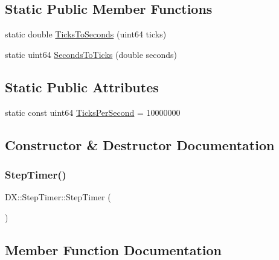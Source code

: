 \subsection*{Static Public Member Functions}
\begin{DoxyCompactItemize}
\item 
static double \hyperlink{class_d_x_1_1_step_timer_a59a20b9b3294d930299991c62703b0d0}{Ticks\+To\+Seconds} (uint64 ticks)
\item 
static uint64 \hyperlink{class_d_x_1_1_step_timer_af6a26dd87202d9eeb167cc0b6e3c1a56}{Seconds\+To\+Ticks} (double seconds)
\end{DoxyCompactItemize}
\subsection*{Static Public Attributes}
\begin{DoxyCompactItemize}
\item 
static const uint64 \hyperlink{class_d_x_1_1_step_timer_aa671440c6c8008bd407ae889f5fb9f87}{Ticks\+Per\+Second} = 10000000
\end{DoxyCompactItemize}


\subsection{Constructor \& Destructor Documentation}
\mbox{\label{class_d_x_1_1_step_timer_ae331f005f44c4e057c4bc7f96fe08f49}} 
\subsubsection{\texorpdfstring{Step\+Timer()}{StepTimer()}}
{\footnotesize\ttfamily D\+X\+::\+Step\+Timer\+::\+Step\+Timer (\begin{DoxyParamCaption}{ }\end{DoxyParamCaption})\hspace{0.3cm}{\ttfamily [inline]}}



\subsection{Member Function Documentation}
\mbox{\label{class_d_x_1_1_step_timer_a979be5067a77c50e31933ec12ca9b61b}} 

